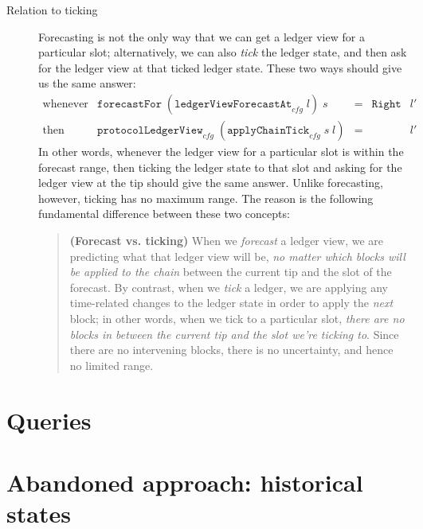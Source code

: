 \begin{description}
\item[Relation to ticking]
Forecasting is not the only way that we can get a ledger view for a particular
slot; alternatively, we can also \emph{tick} the ledger state, and then ask
for the ledger view at that ticked ledger state. These two ways should give us
the same answer:
%
\begin{equation}
\begin{array}{lllll}
\mathrm{whenever} &
\mathtt{forecastFor} \; (\mathtt{ledgerViewForecastAt}_\mathit{cfg} \; l) \; s & = & \mathtt{Right} & l' \\
\mathrm{then} & \mathtt{protocolLedgerView}_\mathit{cfg} \; (\mathtt{applyChainTick}_\mathit{cfg} \; s \; l) & = && l'
\end{array}
\end{equation}
%
In other words, whenever the ledger view for a particular slot is within the
forecast range, then ticking the ledger state to that slot and asking for the
ledger view at the tip should give the same answer. Unlike forecasting, however,
ticking has no maximum range. The reason is the following fundamental difference between these two concepts:
%
\begin{quote}
\textbf{(Forecast vs. ticking)} When we \emph{forecast} a ledger view, we are
predicting what that ledger view will be, \emph{no matter which blocks will  be
applied to the chain} between the current tip and the slot of the forecast. By
contrast, when we \emph{tick} a ledger, we are applying any time-related
changes to the ledger state in order to apply the \emph{next} block; in other
words, when we tick to a particular slot, \emph{there \emph{are} no blocks in
between the current tip and the slot we're ticking to}. Since there are no
intervening blocks, there is no uncertainty, and hence no limited range.
\end{quote}
\end{description}

\section{Queries}
\label{ledger:queries}

\section{Abandoned approach: historical states}
